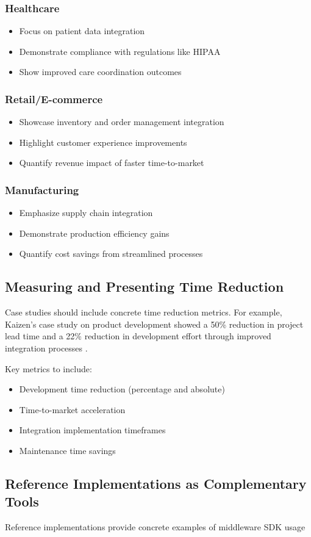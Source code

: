 \documentclass[11pt,a4paper]{article}
\begin{document}
\subsubsection{Healthcare}
\begin{itemize}
    \item Focus on patient data integration
    \item Demonstrate compliance with regulations like HIPAA
    \item Show improved care coordination outcomes
\end{itemize}

\subsubsection{Retail/E-commerce}
\begin{itemize}
    \item Showcase inventory and order management integration
    \item Highlight customer experience improvements
    \item Quantify revenue impact of faster time-to-market
\end{itemize}

\subsubsection{Manufacturing}
\begin{itemize}
    \item Emphasize supply chain integration
    \item Demonstrate production efficiency gains
    \item Quantify cost savings from streamlined processes
\end{itemize}

\subsection{Measuring and Presenting Time Reduction}

Case studies should include concrete time reduction metrics. For example, Kaizen's case study on product development showed a 50\% reduction in project lead time and a 22\% reduction in development effort through improved integration processes \citep{KaizenInstitute2021LeadTime}.

Key metrics to include:
\begin{itemize}
    \item Development time reduction (percentage and absolute)
    \item Time-to-market acceleration
    \item Integration implementation timeframes
    \item Maintenance time savings
\end{itemize}

\subsection{Reference Implementations as Complementary Tools}

Reference implementations provide concrete examples of middleware SDK usage
\end{document}
